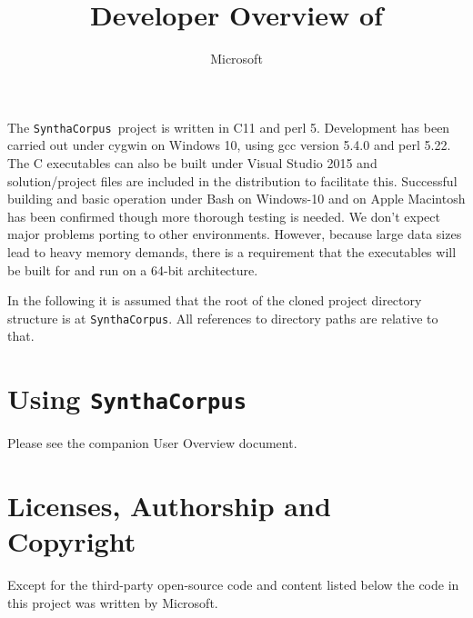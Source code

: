 \documentclass{article}
\title{Developer Overview of \projectName}
\author{Microsoft}
\newcommand{\projectName}{\texttt{SynthaCorpus}}
\begin{document}
\maketitle{}

The \projectName~project is written in C11 and perl 5.  Development
has been carried out under cygwin on Windows 10, using gcc version
5.4.0 and perl 5.22.  The C executables can also be built under Visual
Studio 2015 and solution/project files are included in the
distribution to facilitate this.  Successful building and basic
operation under Bash on Windows-10 and on Apple Macintosh
has been confirmed though more
thorough testing is needed. We don't expect major problems porting to
other environments.  However, because large data sizes lead to heavy
memory demands, there is a requirement that the executables will
be built for and run on a 64-bit architecture.

In the following it is assumed that the root of the cloned project directory
structure is at \texttt{SynthaCorpus}.  All references to directory paths are relative to
that.

\section{Using \projectName}

Please see the companion User Overview document.



\section{Licenses, Authorship and Copyright}
Except for the third-party open-source code and content listed below
the code in this project was written by Microsoft.
\end{document}
